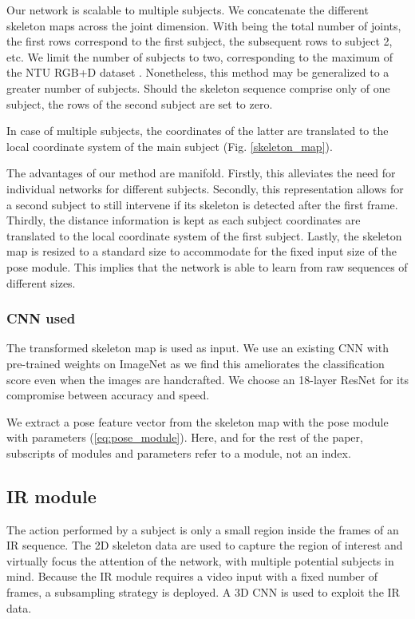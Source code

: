 \documentclass[letterpaper, 10 pt, conference]{ieeeconf}
\begin{document}
Our network is scalable to multiple subjects. We concatenate the different skeleton maps across the joint dimension. With  being the total number of joints, the first  rows correspond to the first subject, the subsequent  rows to subject 2, etc. We limit the number of subjects to two, corresponding to the maximum of the NTU RGB+D dataset \cite{shahroudy2016ntu}. Nonetheless, this method may be generalized to a greater number of subjects. Should the skeleton sequence comprise only of one subject, the  rows of the second subject are set to zero. 

In case of multiple subjects, the coordinates of the latter are translated to the local coordinate system of the main subject (Fig. \ref{skeleton_map}).

The advantages of our method are manifold. Firstly, this alleviates the need for individual networks for different subjects. Secondly, this representation allows for a second subject to still intervene if its skeleton is detected after the first frame. Thirdly, the distance information is kept as each subject coordinates are translated to the local coordinate system of the first subject. Lastly, the skeleton map is resized to a standard size to accommodate for the fixed input size of the pose module. This implies that the network is able to learn from raw sequences of different sizes.

\subsubsection{CNN used}

The transformed skeleton map is used as input. We use an existing CNN with pre-trained weights on ImageNet as we find this ameliorates the classification score even when the images are handcrafted. We choose an 18-layer ResNet \cite{he2016deep} for its compromise between accuracy and speed. 

We extract a pose feature vector  from the skeleton map  with the pose module  with parameters  (\ref{eq:pose_module}). Here, and for the rest of the paper, subscripts of modules and parameters refer to a module, not an index.




\subsection{IR module}

The action performed by a subject is only a small region inside the frames of an IR sequence. The 2D skeleton data are used to capture the region of interest and virtually focus the attention of the network, with multiple potential subjects in mind. Because the IR module requires a video input with a fixed number of frames, a subsampling strategy is deployed. A 3D CNN is used to exploit the IR data.  
\end{document}
